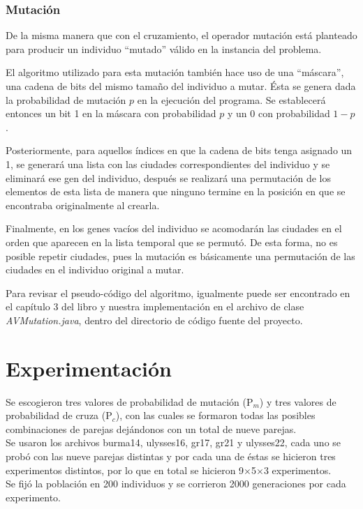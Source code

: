 \documentclass[12pt]{article}
\begin{document}
\subsubsection*{Mutación}
De la misma manera que con el cruzamiento, el operador mutación está planteado
para producir un individuo ``mutado'' válido en la instancia del problema.\par
El algoritmo utilizado para esta mutación también hace uso de una ``máscara'',
una cadena de bits del mismo tamaño del individuo a mutar. Ésta se genera dada
la probabilidad de mutación $p$ en la ejecución del programa. Se establecerá entonces
un bit 1 en la máscara con probabilidad $p$ y un 0 con probabilidad $1-p$.\par
Posteriormente, para aquellos índices en que la cadena de bits tenga asignado
un 1, se generará una lista con las ciudades correspondientes del individuo y
se eliminará ese gen del individuo, después
se realizará una permutación de los elementos de esta lista de manera que
ninguno termine en la posición en que se encontraba originalmente al crearla.\par
Finalmente, en los genes vacíos del individuo se acomodarán las ciudades en el
orden que aparecen en la lista temporal que se permutó. De esta forma, no es posible
repetir ciudades, pues la mutación es básicamente una permutación de las ciudades
en el individuo original a mutar.\par
Para revisar el pseudo-código del algoritmo, igualmente puede ser encontrado en
el capítulo 3 del libro y nuestra implementación en el archivo de clase
\textit{AVMutation.java}, dentro del directorio de código fuente del proyecto.

\section*{Experimentación}
Se escogieron tres valores de probabilidad de mutación (P$_m$) y tres valores de
probabilidad de cruza (P$_c$), con las cuales se formaron todas las posibles
combinaciones de parejas dejándonos con un total de nueve parejas. \\

\noindent Se usaron los archivos burma14, ulysses16, gr17, gr21 y ulysses22, cada uno se probó
con las nueve parejas distintas y por cada una de éstas se hicieron tres experimentos
distintos, por lo que en total se hicieron 9$\times$5$\times$3 experimentos. \\

\noindent Se fijó la población en 200 individuos y se corrieron 2000 generaciones por cada
experimento. \\
\end{document}
